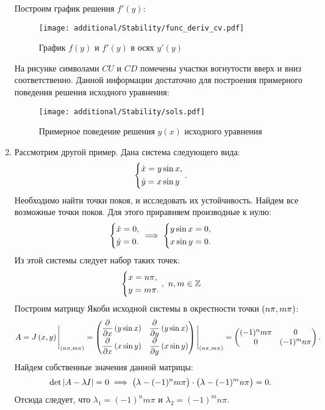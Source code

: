 \begin{enumerate}
				\pagebreak
				
				Построим график решения $f'(y)$:
				\begin{figure}[H]
					\centering
					\texttt{[image: additional/Stability/func\_deriv\_cv.pdf]}
					\caption{График $f(y)$ и $f'(y)$ в осях $y'(y)$}
				\end{figure}
				На рисунке символами $CU$ и $CD$ помечены участки вогнутости вверх и вниз соответственно. Данной информации достаточно для построения примерного поведения решения исходного уравнения:
				\begin{figure}[H]
					\centering
					\texttt{[image: additional/Stability/sols.pdf]}
					\caption{Примерное поведение решения $y(x)$ исходного уравнения}
				\end{figure}

				\pagebreak

			\item Рассмотрим другой пример. Дана система следующего вида:
				\[ \left\lbrace \begin{aligned} &\dot{x} = y\sin{x}, \\ &\dot{y} = x\sin{y} \end{aligned} \right.. \]
				Необходимо найти точки покоя, и исследовать их устойчивость. Найдем все возможные точки покоя. Для этого приравняем производные к нулю:
				\[ \left\lbrace \begin{aligned} &\dot{x} = 0, \\ &\dot{y} = 0. \end{aligned} \right. \implies \left\lbrace \begin{aligned} &y \sin{x} = 0, \\ &x \sin{y} = 0. \end{aligned} \right. \]
				Из этой системы следует набор таких точек:
				\[ \left\lbrace \begin{aligned} &x = n\pi, \\ &y = m\pi. \end{aligned} \right., ~ n, m \in \mathbb{Z} \]
				Построим матрицу Якоби исходной системы в окрестности точки $\left( n\pi, m\pi \right)$:
				\[ A = J\left( x, y \right) \Biggl\vert \Biggr._{\left( n \pi, m \pi \right)} = \begin{pmatrix} 
					\dfrac{\partial }{\partial x}\left( y \sin{x} \right) & \dfrac{\partial }{\partial y}\left( y \sin{x} \right) \\
					\dfrac{\partial }{\partial x}\left( x \sin{y} \right) & \dfrac{\partial }{\partial y}\left( x \sin{y} \right)
				\end{pmatrix} \Biggl\vert \Biggr._{\left( n \pi, m \pi \right)} = \begin{pmatrix}
					(-1)^n m \pi & 0 \\
					0 & (-1)^m n \pi
				\end{pmatrix}. \]
				Найдем собственные значения данной матрицы:
				\[ \det{ \left\vert A - \lambda I \right\vert } = 0 \implies \bigl( \lambda - (-1)^n m \pi \bigr) \cdot \bigl( \lambda - (-1)^m n \pi \bigr) = 0. \]
				Отсюда следует, что $\lambda_1 = (-1)^n m \pi$ и $\lambda_2 = (-1)^m n \pi$. 


\end{enumerate}
